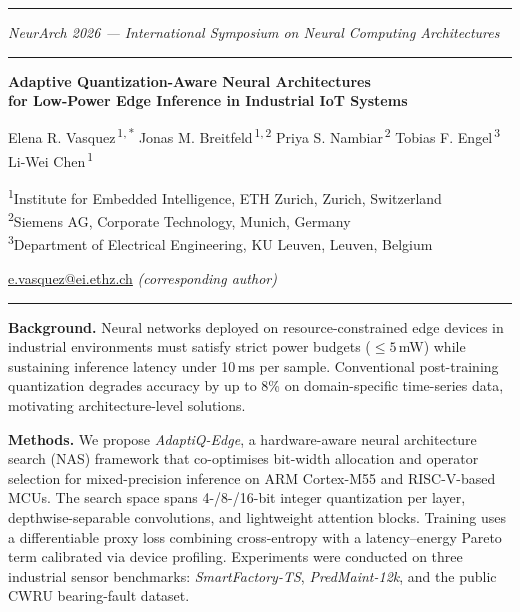 \documentclass[11pt,a4paper]{article}
\newcommand{\accentrule}{%
  {\color{accent}\rule{\linewidth}{1.6pt}}}
\newcommand{\thinrule}{%
  {\color{rulegray}\rule{\linewidth}{0.4pt}}}
\newcommand{\affsym}[1]{\textsuperscript{\,#1}}
\newcommand{\affline}[2]{%
  \textsuperscript{#1}{\small #2}\\[-1pt]}
\newcommand{\ahead}[1]{{\color{accent}\textbf{#1.}}\enspace}
\begin{document}

\accentrule
\vspace{1pt}
{\hfill\footnotesize\color{accent}\textit{NeurArch 2026 — International Symposium on Neural Computing Architectures}}
\vspace{3pt}
\thinrule

\vspace{6pt}
{\Large\bfseries\color{black}
Adaptive Quantization-Aware Neural Architectures\\[2pt]
for Low-Power Edge Inference in Industrial IoT Systems}
\vspace{5pt}

{\normalsize
Elena R. Vasquez\affsym{1,\,*}\quad
Jonas M. Breitfeld\affsym{1,\,2}\quad
Priya S. Nambiar\affsym{2}\quad
Tobias F. Engel\affsym{3}\quad
Li-Wei Chen\affsym{1}
}
\vspace{4pt}

{\small
\affline{1}{Institute for Embedded Intelligence, ETH Zurich, Zurich, Switzerland}
\affline{2}{Siemens AG, Corporate Technology, Munich, Germany}
\affline{3}{Department of Electrical Engineering, KU Leuven, Leuven, Belgium}
}

{\small
\faEnvelope[regular]\enspace
\href{mailto:e.vasquez@ei.ethz.ch}{\color{accent}e.vasquez@ei.ethz.ch}
\quad\textit{(corresponding author)}
}

\vspace{4pt}
\thinrule
\vspace{6pt}

\ahead{Background}
Neural networks deployed on resource-constrained edge devices in industrial environments
must satisfy strict power budgets ($\leq\!5\,$mW) while sustaining inference latency under
10\,ms per sample. Conventional post-training quantization degrades accuracy by
up to 8\% on domain-specific time-series data, motivating architecture-level solutions.

\ahead{Methods}
We propose \textit{AdaptiQ-Edge}, a hardware-aware neural architecture search (NAS)
framework that co-optimises bit-width allocation and operator selection for
mixed-precision inference on ARM Cortex-M55 and RISC-V-based MCUs.
The search space spans 4-/8-/16-bit integer quantization per layer, depthwise-separable
convolutions, and lightweight attention blocks.
Training uses a differentiable proxy loss combining cross-entropy with a
latency–energy Pareto term calibrated via device profiling.
Experiments were conducted on three industrial sensor benchmarks: \textit{SmartFactory-TS},
\textit{PredMaint-12k}, and the public CWRU bearing-fault dataset.
\end{document}
